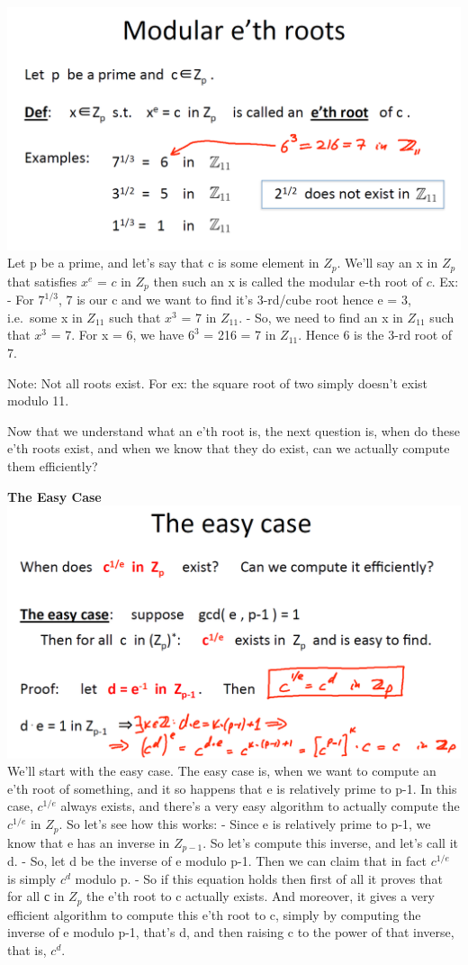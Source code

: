 \documentclass[11pt]{article}
\makeatletter
\def\maxwidth{\ifdim\Gin@nat@width>\linewidth\linewidth
    \else\Gin@nat@width\fi}
\let\Oldincludegraphics\includegraphics
\renewcommand{\includegraphics}[1]{\Oldincludegraphics[width=.8\maxwidth]{#1}}
\makeatother
\begin{document}
\includegraphics{./Images/NT-ModEthRoot.png} Let p be a prime, and let's
say that c is some element in \(Z_{p}\). We'll say an x in \(Z_{p}\)
that satisfies \(x^{e}\) = \(c\) in \(Z_{p}\) then such an x is called
the modular e-th root of \(c\). Ex: - For \(7^{1/3}\), 7 is our c and we
want to find it's 3-rd/cube root hence e = 3, i.e.~some x in \(Z_{11}\)
such that \(x^{3}\) = 7 in \(Z_{11}\). - So, we need to find an x in
\(Z_{11}\) such that \(x^{3}\) = 7. For x = 6, we have \(6^{3}\) = 216 =
7 in \(Z_{11}\). Hence 6 is the 3-rd root of 7.

Note: Not all roots exist. For ex: the square root of two simply doesn't
exist modulo 11.

Now that we understand what an e'th root is, the next question is, when
do these e'th roots exist, and when we know that they do exist, can we
actually compute them efficiently?

\textbf{The Easy Case} \includegraphics{./Images/NT-RootEasyCase.png}
We'll start with the easy case. The easy case is, when we want to
compute an e'th root of something, and it so happens that e is
relatively prime to p-1. In this case, \(c^{1/e}\) always exists, and
there's a very easy algorithm to actually compute the \(c^{1/e}\) in
\(Z_{p}\). So let's see how this works: - Since e is relatively prime to
p-1, we know that e has an inverse in \(Z_{p-1}\). So let's compute this
inverse, and let's call it d. - So, let d be the inverse of e modulo
p-1. Then we can claim that in fact \(c^{1/e}\) is simply \(c^{d}\)
modulo p. - So if this equation holds then first of all it proves that
for all с in \(Z_{p}\) the e'th root to c actually exists. And moreover,
it gives a very efficient algorithm to compute this e'th root to c,
simply by computing the inverse of e modulo p-1, that's d, and then
raising c to the power of that inverse, that is, \(c^{d}\).
\end{document}
